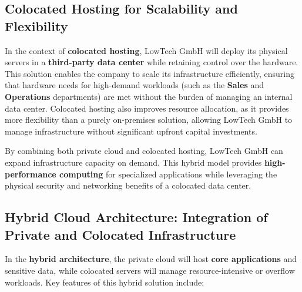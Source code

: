 \subsection{Colocated Hosting for Scalability and Flexibility}

In the context of \textbf{colocated hosting}, LowTech GmbH will deploy its physical servers in a \textbf{third-party data center} while retaining control over the hardware. This solution enables the company to scale its infrastructure efficiently, ensuring that hardware needs for high-demand workloads (such as the \textbf{Sales} and \textbf{Operations} departments) are met without the burden of managing an internal data center. Colocated hosting also improves resource allocation, as it provides more flexibility than a purely on-premises solution, allowing LowTech GmbH to manage infrastructure without significant upfront capital investments.

By combining both private cloud and colocated hosting, LowTech GmbH can expand infrastructure capacity on demand. This hybrid model provides \textbf{high-performance computing} for specialized applications while leveraging the physical security and networking benefits of a colocated data center.

\subsection{Hybrid Cloud Architecture: Integration of Private and Colocated Infrastructure}

In the \textbf{hybrid architecture}, the private cloud will host \textbf{core applications} and sensitive data, while colocated servers will manage resource-intensive or overflow workloads. Key features of this hybrid solution include:

